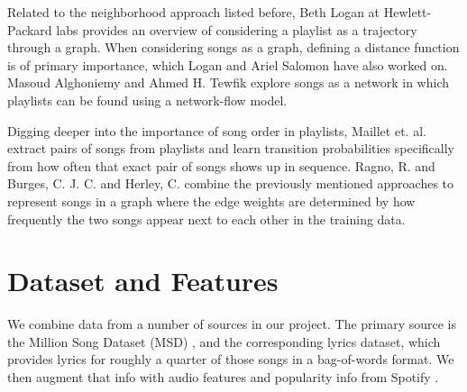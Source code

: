 \documentclass[acmtog]{acmart}
\begin{document}
Related to the neighborhood approach listed before, Beth Logan \cite{BethLogan} at Hewlett-Packard labs provides an overview of considering a playlist as a trajectory through a graph. When considering songs as a graph, defining a distance function is of primary importance, which Logan and Ariel Salomon \cite{LoganSalomon} have also worked on. Masoud Alghoniemy and Ahmed H. Tewfik \cite{Alghoniemy01anetwork} explore songs as a network in which playlists can be found using a network-flow model.

Digging deeper into the importance of song order in playlists, Maillet et. al. \cite{Maillet09steerableplaylist} extract pairs of songs from playlists and learn transition probabilities specifically from how often that exact pair of songs shows up in sequence. Ragno, R. and Burges, C. J. C. and Herley, C. \cite{Ragno:2005:ISM:1101826.1101840} combine the previously mentioned approaches to represent songs in a graph where the edge weights are determined by how frequently the two songs appear next to each other in the training data.

\section{Dataset and Features}

We combine data from a number of sources in our project. The primary source is the Million Song Dataset (MSD) \cite{msd}, and the corresponding lyrics dataset, which provides lyrics for roughly a quarter of those songs in a bag-of-words format. We then augment that info with audio features and popularity info from Spotify \cite{spotify}.
\end{document}

